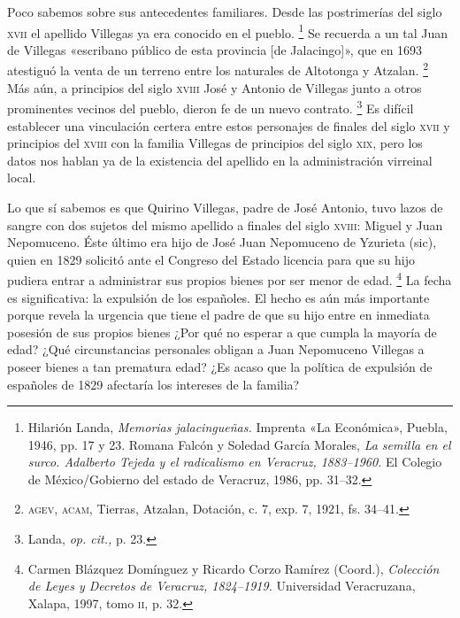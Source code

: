 \documentclass[14pt,twoside,final]{extbook} %
\let\oldfootnote\footnote
\renewcommand\footnote[1]{%
\oldfootnote{\hspace{1mm}#1}}
\begin{document}
Poco sabemos sobre sus antecedentes familiares. Desde las postrimerías del siglo \textsc{xvii} el apellido Villegas ya era conocido en el pueblo.\footnote{Hilarión Landa, \emph{Memorias jalacingueñas.} Imprenta «La Económica», Puebla, 1946, pp. 17 y 23. Romana Falcón y Soledad García Morales, \emph{La semilla en el surco. Adalberto Tejeda y el radicalismo en Veracruz, 1883--1960.} El Colegio de México/Gobierno del estado de Veracruz, 1986, pp. 31--32.} Se recuerda a un tal Juan de Villegas «escribano público de esta provincia [de Jalacingo]», que en 1693 atestiguó la venta de un terreno entre los naturales de Altotonga y Atzalan.\footnote{\textsc{agev, acam}, Tierras, Atzalan, Dotación, c. 7, exp. 7, 1921, fs. 34--41.} Más aún, a principios del siglo \textsc{xviii} José y Antonio de Villegas junto a otros prominentes vecinos del pueblo, dieron fe de un nuevo contrato.\footnote{Landa, \emph{op. cit.,} p. 23.} Es difícil establecer una vinculación certera entre estos personajes de finales del siglo \textsc{xvii} y principios del \textsc{xviii} con la familia Villegas de principios del siglo \textsc{xix}, pero los datos nos hablan ya de la existencia del apellido en la administración virreinal local.

Lo que sí sabemos es que Quirino Villegas, padre de José Antonio, tuvo lazos de sangre con dos sujetos del mismo apellido a finales del siglo \textsc{xviii}: Miguel y Juan Nepomuceno. Éste último era hijo de José Juan Nepomuceno de Yzurieta (sic), quien en 1829 solicitó ante el Congreso del Estado licencia para que su hijo pudiera entrar a administrar sus propios bienes por ser menor de edad.\footnote{Carmen Blázquez Domínguez y Ricardo Corzo Ramírez (Coord.), \emph{Colección de Leyes y Decretos de Veracruz, 1824--1919.} Universidad Veracruzana, Xalapa, 1997, tomo \textsc{ii}, p. 32.} La fecha es significativa: la expulsión de los españoles. El hecho es aún más importante porque revela la urgencia que tiene el padre de que su hijo entre en inmediata posesión de sus propios bienes ¿Por qué no esperar a que cumpla la mayoría de edad? ¿Qué circunstancias personales obligan a Juan Nepomuceno Villegas a poseer bienes a tan prematura edad? ¿Es acaso que la política de expulsión de españoles de 1829 afectaría los intereses de la familia?
\end{document}
